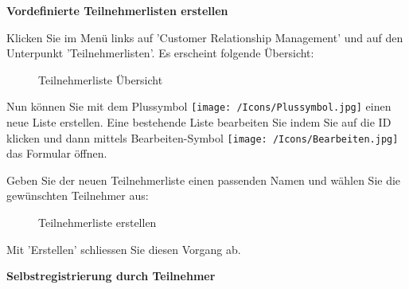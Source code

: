 \pagebreak
\textbf{Vordefinierte Teilnehmerlisten erstellen}
\label{bkm:Ref2018072301}

Klicken Sie im Menü links auf 'Customer Relationship Management' und auf den Unterpunkt 'Teilnehmerlisten'. Es erscheint folgende Übersicht:

\begin{figure}[H]
\caption{Teilnehmerliste Übersicht}
\end{figure}

Nun können Sie mit dem Plussymbol \texttt{[image: /Icons/Plussymbol.jpg]}  einen neue Liste erstellen. Eine bestehende Liste bearbeiten Sie indem Sie auf die ID  klicken und dann mittels Bearbeiten-Symbol \texttt{[image: /Icons/Bearbeiten.jpg]}  das Formular öffnen.

\vspace{\baselineskip}

Geben Sie der neuen Teilnehmerliste einen passenden Namen und wählen Sie die gewünschten Teilnehmer aus:

\begin{figure}[H]
\caption{Teilnehmerliste erstellen}
\end{figure}

Mit 'Erstellen' schliessen Sie diesen Vorgang ab. 

\pagebreak
\textbf{Selbstregistrierung durch Teilnehmer}
\label{bkm:Ref2018072302}

